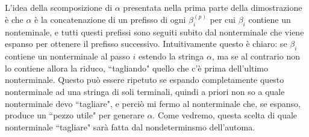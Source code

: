 \documentclass[12pt]{article}
\numberwithin{theorem}{subsection}
\begin{document}
\begin{remark}
	L'idea della scomposizione di $\alpha$ presentata nella prima parte della dimostrazione è che $\alpha$ è la concatenazione di un prefisso di ogni $\beta_i^{(p)}$ per cui $\beta_i$ contiene un nonteminale, e tutti questi prefissi sono seguiti subito dal nonterminale che viene espanso per ottenere il prefisso successivo. Intuitivamente questo è chiaro: se $\beta_i$ contiene un nonterminale al passo $i$ estendo la stringa $\alpha$, ma se al contrario non lo contiene allora la riduco, ``tagliando" quello che c'è prima dell'ultimo nonterminale. Questo può essere ripetuto se espando completamente questo nonterminale ad una stringa di soli terminali, quindi a priori non so a quale nonterminale devo ``tagliare", e perciò mi fermo al nonterminale che, se espanso, produce un ``pezzo utile" per generare $\alpha$.
	Come vedremo, questa scelta di quale nonterminale ``tagliare" sarà fatta dal nondeterminsmo dell'automa.
\end{remark}
\end{document}

